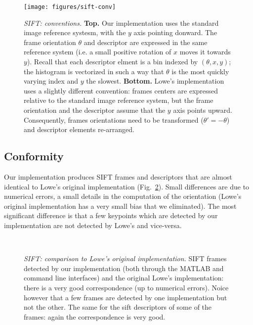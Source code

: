 \documentclass{article}
\begin{document}
\begin{figure}
\begin{center}
\texttt{[image: figures/sift-conv]}
\end{center}
\caption{{\em SIFT: conventions.} {\bf Top.} Our implementation uses
  the standard image reference systesm, with the $y$ axis pointing
  donward. The frame orientation $\theta$ and descriptor are expressed
  in the same reference system (i.e. a small positive rotation of $x$
  moves it towards $y$). Recall that each descriptor elment is a bin
  indexed by $(\theta,x,y)$; the histogram is vectorized in such a way
  that $\theta$ is the most quickly varying index and $y$ the
  slowest. {\bf Bottom.} Lowe's implementation uses a slightly
  different convention: frames centers are expressed relative to the
  standard image reference system, but the frame orientation and the
  descriptor assume that the $y$ axis points upward. Consequently,
  frames orientations need to be transformed ($\theta'=-\theta$) and
  descriptor elements re-arranged.}
\label{fig:sift-conv}
\end{figure}

\subsection{Conformity}\label{sift.conformity}

Our implementation produces SIFT frames and descriptors that are
almost identical to Lowe's original implementation
(Fig.~\ref{fig:sift-conformity}). Small differences are due to
numerical errors, a small details in the computation of the
orientation (Lowe's original implementation has a very small bias that
we eliminated). The most significant difference is that a few
keypoints which are detected by our implementation are not detected by
Lowe's and vice-versa.

\begin{figure}
\begin{center}
\hfill
{}\\
\end{center}
\caption{ {\em SIFT: comparison to Lowe's original implementation.}
  \protect{} SIFT frames detected by our
  implementation (both through the MATLAB and command line interfaces)
  and the original Lowe's implementation: there is a very good
  correspondence (up to numerical errors).  Noice however that a few
  frames are detected by one implementation but not the other.
  \protect{} The same for the sift descriptors of some
  of the frames: again the correspondence is very good.}
\label{fig:sift-conformity}
\end{figure}
\end{document}
